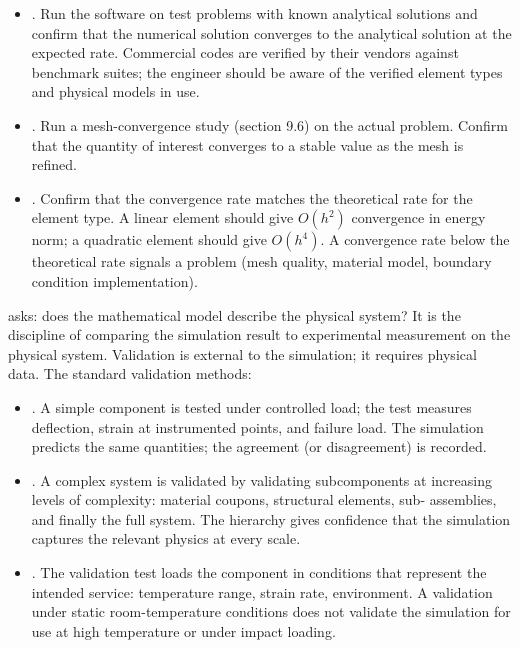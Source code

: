 \begin{itemize}[leftmargin=*]
  \item {}. Run the software on test
    problems with known analytical solutions and confirm that the
    numerical solution converges to the analytical solution at
    the expected rate. Commercial codes are verified by their
    vendors against benchmark suites; the engineer should be
    aware of the verified element types and physical models in
    use.
  \item {}. Run a mesh-convergence
    study (section 9.6) on the actual problem. Confirm that the
    quantity of interest converges to a stable value as the mesh
    is refined.
  \item {}. Confirm that the
    convergence rate matches the theoretical rate for the element
    type. A linear element should give $O(h^2)$ convergence in
    energy norm; a quadratic element should give $O(h^4)$. A
    convergence rate below the theoretical rate signals a problem
    (mesh quality, material model, boundary condition
    implementation).
\end{itemize}

 asks: does the mathematical model describe
the physical system? It is the discipline of comparing the
simulation result to experimental measurement on the physical
system. Validation is external to the simulation; it requires
physical data. The standard validation methods:

\begin{itemize}[leftmargin=*]
  \item {}. A simple
    component is tested under controlled load; the test measures
    deflection, strain at instrumented points, and failure load.
    The simulation predicts the same quantities; the agreement
    (or disagreement) is recorded.
  \item {}. A complex system is
    validated by validating subcomponents at increasing levels of
    complexity: material coupons, structural elements, sub-
    assemblies, and finally the full system. The hierarchy gives
    confidence that the simulation captures the relevant physics
    at every scale.
  \item {}. The
    validation test loads the component in conditions that
    represent the intended service: temperature range, strain
    rate, environment. A validation under static room-temperature
    conditions does not validate the simulation for use at high
    temperature or under impact loading.
\end{itemize}

